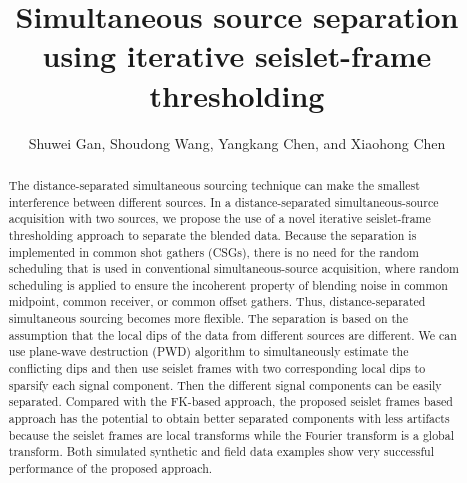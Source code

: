 
\title{Simultaneous source separation using iterative seislet-frame thresholding}

\renewcommand{\thefootnote}{\fnsymbol{footnote}}
\author{Shuwei Gan\footnotemark[1], Shoudong Wang\footnotemark[2], Yangkang Chen\footnotemark[3], and Xiaohong Chen\footnotemark[2]}
\address{
\footnotemark[1] State Key Laboratory of Petroleum Resources and Prospecting \\
China University of Petroleum \\
Fuxue Road 18th\\
Beijing, China, 102200 \\
\footnotemark[2]Bureau of Economic Geology \\
John A. and Katherine G. Jackson School of Geosciences \\
The University of Texas at Austin \\
University Station, Box X \\
Austin, TX 78713-8924 \\
Email: ykchen@utexas.edu \\
}


\maketitle

\begin{abstract}
The distance-separated simultaneous sourcing technique can make the smallest interference between different sources. In a distance-separated simultaneous-source acquisition with two sources, we propose the use of a novel iterative seislet-frame thresholding approach to separate the blended data. Because the separation is implemented in common shot gathers (CSGs), there is no need for the random scheduling that is used in conventional simultaneous-source acquisition, where random scheduling is applied to ensure the incoherent property of blending noise in common midpoint, common receiver, or common offset gathers. Thus, distance-separated simultaneous sourcing becomes more flexible. The separation is based on the assumption that the local dips of the data from different sources are different. We can use plane-wave destruction (PWD) algorithm to simultaneously estimate the conflicting dips and then use seislet frames with two corresponding local dips to sparsify each signal component. Then the different signal components can be easily separated. Compared with the FK-based approach, the proposed seislet frames based approach has the potential to obtain better separated components with less artifacts because the seislet frames are local transforms while the Fourier transform is a global transform. Both simulated synthetic and field data examples show very successful performance of the proposed approach.
\end{abstract}

